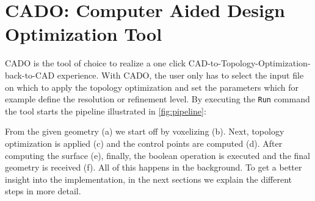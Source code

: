 \section{CADO: Computer Aided Design Optimization Tool}
CADO is the tool of choice to realize a one click CAD-to-Topology-Optimization-back-to-CAD experience. With CADO, the user only has to select the input file on which to apply the topology optimization and set the parameters which for example define the resolution or refinement level. By executing the \texttt{Run} command the tool starts the pipeline illustrated in \autoref{fig:pipeline}: 

From the given geometry (a) we start off by voxelizing (b). Next, topology optimization is applied (c) and the control points are computed (d). After computing the surface (e), finally, the boolean operation is executed and the final geometry is received (f). All of this happens in the background. To get a better insight into the implementation, in the next sections we explain the different steps in more detail.
